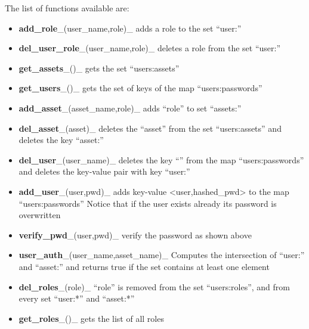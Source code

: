 The list of functions available are:

\begin{itemize}
\tightlist
\item
  \textbf{add\_role}\_(user\_name,role)\_ adds a role to the set
  ``user:''
\item
  \textbf{del\_user\_role}\_(user\_name,role)\_ deletes a role from the
  set ``user:''
\item
  \textbf{get\_assets}\_()\_ gets the set ``users:assets''
\item
  \textbf{get\_users}\_()\_ gets the set of keys of the map
  ``users:passwords''
\item
  \textbf{add\_asset}\_(asset\_name,role)\_ adds ``role'' to set
  ``assets:''
\item
  \textbf{del\_asset}\_(asset)\_ deletes the ``asset'' from the set
  ``users:assets'' and deletes the key ``asset:''
\item
  \textbf{del\_user}\_(user\_name)\_ deletes the key ``'' from the map
  ``users:passwords'' and deletes the key-value pair with key ``user:''
\item
  \textbf{add\_user}\_(user,pwd)\_ adds key-value
  \textless{}user,hashed\_pwd\textgreater{} to the map
  ``users:passwords'' Notice that if the user exists already its
  password is overwritten
\item
  \textbf{verify\_pwd}\_(user,pwd)\_ verify the password as shown above
\item
  \textbf{user\_auth}\_(user\_name,asset\_name)\_ Computes the
  intersection of ``user:'' and ``asset:'' and returns true if the set
  contains at least one element
\item
  \textbf{del\_roles}\_(role)\_ ``role'' is removed from the set
  ``users:roles'', and from every set ``user:*'' and ``asset:*''
\item
  \textbf{get\_roles}\_()\_ gets the list of all roles
\end{itemize}
